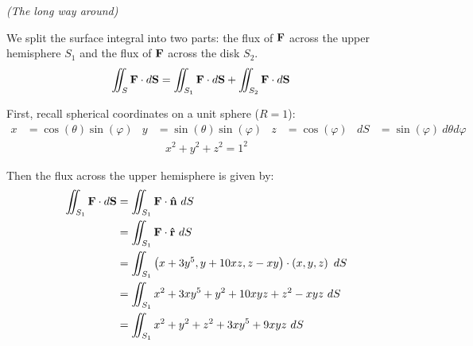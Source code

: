 \begin{solution}
    \textit{(The long way around)} 
    
    We split the surface integral into two parts: the flux of \(\vb{F}\) across the upper hemisphere \(S_1\) and the flux of \(\vb{F}\) across the disk \(S_2\).
    \begin{align}
        \iint_S \vb{F} \cdot d\vb{S} &= \iint_{S_1} \vb{F} \cdot d\vb{S} + \iint_{S_2} \vb{F} \cdot d\vb{S}
    \end{align}
    
    First, recall spherical coordinates on a unit sphere (\(R = 1\)):
    \begin{align}
        x &= \cos(\theta) \sin(\varphi) & y &= \sin(\theta) \sin(\varphi) & z &= \cos(\varphi) & dS &= \sin(\varphi) \ d\theta d\varphi
    \end{align}
    \begin{align}
        x^2 + y^2 + z^2 = 1^2
    \end{align}
    
    Then the flux across the upper hemisphere is given by:
    \begin{align*}
        \iint_{S_1} \vb{F} \cdot d\vb{S} &= \iint_{S_1} \vb{F} \cdot \vb{\hat{n}} \ dS \\
        &= \iint_{S_1} \vb{F} \cdot \vb{\hat{r}} \ dS \\
        &= \iint_{S_1} \left(x + 3y^5, y + 10xz, z - xy\right) \cdot \left(x, y, z\right) \ dS \\
        &= \iint_{S_1} x^2 + 3xy^5 + y^2 + 10xyz + z^2 - xyz \ dS \\
        &= \iint_{S_1} x^2 + y^2 + z^2 + 3xy^5 + 9xyz \ dS \\
    \end{align*}
    

\end{solution}
